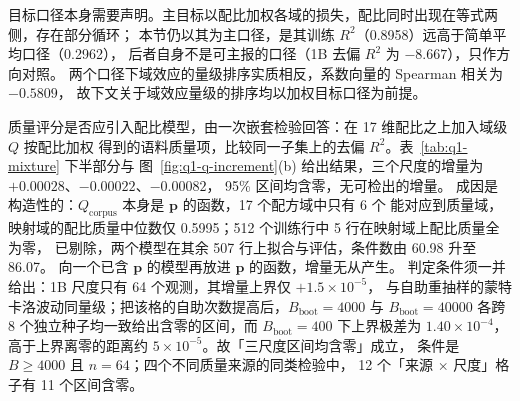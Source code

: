目标口径本身需要声明。主目标以配比加权各域的损失，配比同时出现在等式两侧，存在部分循环；
本节仍以其为主口径，是其训练 $R^{2}$（0.8958）远高于简单平均口径（0.2962），
后者自身不是可主报的口径（1B 去偏 $R^{2}$ 为 $-8.667$），只作方向对照。
两个口径下域效应的量级排序实质相反，系数向量的 Spearman 相关为 $-0.5809$，
故下文关于域效应量级的排序均以加权目标口径为前提。

质量评分是否应引入配比模型，由一次嵌套检验回答：在 17 维配比之上加入域级 $Q$ 按配比加权
得到的语料质量项，比较同一子集上的去偏 $R^{2}$。表~\ref{tab:q1-mixture} 下半部分与
图~\ref{fig:q1-q-increment}(b) 给出结果，三个尺度的增量为 $+0.00028$、$-0.00022$、$-0.00082$，
95\% 区间均含零，无可检出的增量。
成因是构造性的：$Q_{\text{corpus}}$ 本身是 $\boldsymbol{p}$ 的函数，17 个配方域中只有 6 个
能对应到质量域，映射域的配比质量中位数仅 0.5995；512 个训练行中 5 行在映射域上配比质量全为零，
已剔除，两个模型在其余 507 行上拟合与评估，条件数由 60.98 升至 86.07。
向一个已含 $\boldsymbol{p}$ 的模型再放进 $\boldsymbol{p}$ 的函数，增量无从产生。
判定条件须一并给出：1B 尺度只有 64 个观测，其增量上界仅 $+1.5\times10^{-5}$，
与自助重抽样的蒙特卡洛波动同量级；把该格的自助次数提高后，$B_{\mathrm{boot}}=4000$ 与 $B_{\mathrm{boot}}=40000$
各跨 8 个独立种子均一致给出含零的区间，而 $B_{\mathrm{boot}}=400$ 下上界极差为 $1.40\times10^{-4}$，
高于上界离零的距离约 $5\times10^{-5}$。故「三尺度区间均含零」成立，
条件是 $B\ge4000$ 且 $n=64$；四个不同质量来源的同类检验中，
12 个「来源 $\times$ 尺度」格子有 11 个区间含零。

